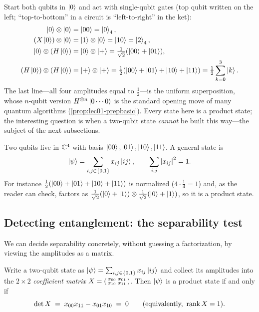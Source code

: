 \begin{example}\label{exa:lec01-prod-gates}
Start both qubits in $\ket0$ and act with single-qubit gates (top qubit written on the
left; ``top-to-bottom'' in a circuit is ``left-to-right'' in the ket):
\[
  \begin{aligned}
   \ket0\otimes\ket0 &= \ket{00}=\ket{0}_4, \\
   (X\ket0)\otimes\ket0 &= \ket1\otimes\ket0=\ket{10}=\ket{2}_4, \\
   \ket0\otimes(H\ket0) &= \ket0\otimes\ket{+}=\tfrac1{\sqrt2}(\ket{00}+\ket{01}), \\
   (H\ket0)\otimes(H\ket0) &= \ket{+}\otimes\ket{+}
       =\tfrac12(\ket{00}+\ket{01}+\ket{10}+\ket{11})=\tfrac12\sum_{k=0}^{3}\ket{k}.
  \end{aligned}
\]
The last line---all four amplitudes equal to $\tfrac12$---is the uniform superposition,
whose $n$-qubit version $H^{\otimes n}\ket{0\cdots0}$ is the standard opening move of
many quantum algorithms (\cref{prop:lec01-prepbasic}). Every
state here is a product state; the interesting question is when a two-qubit state
\emph{cannot} be built this way---the subject of the next subsections.
\end{example}

\begin{example}
Two qubits live in $\mathbb{C}^{4}$ with basis $\ket{00},\ket{01},\ket{10},\ket{11}$. A
general state is
\[
  \ket{\psi}=\sum_{i,j\in\{0,1\}}x_{ij}\ket{ij},\qquad
  \sum_{i,j}\left\lvert x_{ij} \right\rvert^{2}=1 .
\]
For instance $\tfrac12(\ket{00}+\ket{01}+\ket{10}+\ket{11})$ is normalized
($4\cdot\tfrac14=1$) and, as the reader can check, factors as
$\tfrac{1}{\sqrt2}(\ket{0}+\ket{1})\otimes\tfrac{1}{\sqrt2}(\ket{0}+\ket{1})$, so it
is a product state.
\end{example}

\subsection{Detecting entanglement: the separability test}
\label{sec:lec01-septest-sub}

We can decide separability concretely, without guessing a factorization, by viewing
the amplitudes as a matrix.

\begin{proposition}\label{prop:lec01-septest}
Write a two-qubit state as $\ket{\psi}=\sum_{i,j\in\{0,1\}}x_{ij}\ket{ij}$ and collect
its amplitudes into the $2\times2$ \emph{coefficient matrix}
$X=\begin{psmallmatrix}x_{00}&x_{01}\\ x_{10}&x_{11}\end{psmallmatrix}$. Then
$\ket{\psi}$ is a product state if and only if
\[
  \det X \;=\; x_{00}x_{11}-x_{01}x_{10}\;=\;0
  \qquad(\text{equivalently, } \operatorname{rank} X=1).
\]
\end{proposition}

